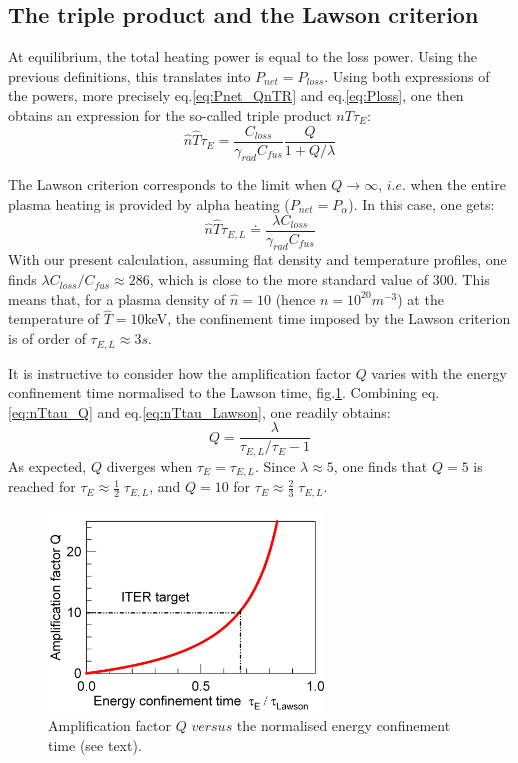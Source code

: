 \subsection{The triple product and the Lawson criterion}
At equilibrium, the total heating power is equal to the loss power. Using the previous definitions, this translates into $P_{net} =P_{loss}$.
Using both expressions of the powers, more precisely eq.\ref{eq:Pnet_QnTR} and eq.\ref{eq:Ploss}, one then obtains an expression for the so-called triple product $nT\tau_E$:
\begin{equation}
\boxed{
  \hat n \hat T \tau_E = \frac{C_{loss}}{\gamma_{rad} C_{fus}} \frac{Q}{1+Q/\lambda} }
\label{eq:nTtau_Q}
\end{equation}

The Lawson criterion corresponds to the limit when $Q\to\infty$, $i.e.$ when the entire plasma heating is provided by alpha heating ($P_{net}=P_\alpha$). In this case, one gets:
\begin{equation}
  \hat n \hat T \tau_{E,L} \doteq \frac{\lambda C_{loss}}{\gamma_{rad} C_{fus}}
\label{eq:nTtau_Lawson}
\end{equation}
With our present calculation, assuming flat density and temperature profiles, one finds $\lambda C_{loss}/C_{fus} \approx 286$, which is close to the more standard value of 300. This means that, for a plasma density of $\hat n=10$ (hence $n=10^{20}\si{m^{-3}}$) at the temperature of $\hat T=10$keV, the confinement time imposed by the Lawson criterion is of order of $\tau_{E,L} \approx 3s$.

It is instructive to consider how the amplification factor $Q$ varies with the energy confinement time normalised to the Lawson time, fig.\ref{fig:Q_tauE}. Combining eq.\ref{eq:nTtau_Q} and eq.\ref{eq:nTtau_Lawson}, one readily obtains:
\begin{equation*}
    Q = \frac{\lambda}{\tau_{E,L}/\tau_E - 1}
\end{equation*}
As expected, $Q$ diverges when $\tau_E = \tau_{E,L}$. Since $\lambda \approx 5$, one finds that $Q=5$ is reached for $\tau_E \approx \frac{1}{2}\; \tau_{E,L}$, and $Q=10$ for $\tau_E \approx \frac{2}{3}\; \tau_{E,L}$.

\begin{figure} 
	\begin{center}
		\includegraphics[width=0.65\textwidth]{figures/Graph_Qfactor_tauE.png}
		\caption{Amplification factor $Q$ $versus$ the normalised energy confinement time (see text).}
		\label{fig:Q_tauE}
	\end{center}
\end{figure}


